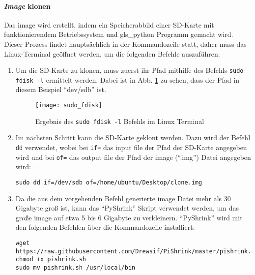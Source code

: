 \paragraph{\textit{Image} klonen}
Das \gls{image} wird erstellt, indem ein Speicherabbild einer SD-Karte mit funktionierendem Betriebssystem und \gls{gls_python} Programm gemacht wird. Dieser Prozess findet hauptsächlich in der Kommandozeile statt, daher muss das Linux-Terminal geöffnet werden, um die folgenden Befehle auszuführen:
\begin{enumerate}

    \item Um die SD-Karte zu klonen, muss zuerst ihr Pfad mithilfe des Befehls \texttt{sudo fdisk -l} ermittelt werden. Dabei ist in Abb. \ref{fig:sudo_fdisk} zu sehen, dass der Pfad in diesem Beispiel \enquote{dev/sdb} ist.
    \begin{figure}[H]
        \centering
        \texttt{[image: sudo\_fdisk]}
        \caption{Ergebnis des \texttt{sudo fdisk -l} Befehls im Linux Terminal}
        \label{fig:sudo_fdisk}
    \end{figure}
    
    \item Im nächsten Schritt kann die SD-Karte geklont werden. Dazu wird der Befehl \texttt{dd} verwendet, wobei bei \texttt{if=} das input file \bzw der Pfad der SD-Karte angegeben wird und bei \texttt{of=} das output file \bzw der Pfad der \gls{image} (\enquote{.img}) Datei angegeben wird:
    \begin{verbatim}
sudo dd if=/dev/sdb of=/home/ubuntu/Desktop/clone.img
    \end{verbatim}

    \item Da die aus dem vorgehenden Befehl generierte \gls{image} Datei mehr als 30 Gigabyte groß ist, kann das \enquote{PyShrink} Skript verwendet werden, um das große  \gls{image} auf etwa 5 bis 6 Gigabyte zu verkleinern. \enquote{PyShrink} wird mit den folgenden Befehlen über die Kommandozeile installiert:
    \begin{verbatim}
wget https://raw.githubusercontent.com/Drewsif/PiShrink/master/pishrink.sh
chmod +x pishrink.sh
sudo mv pishrink.sh /usr/local/bin
    \end{verbatim}


\end{enumerate}
